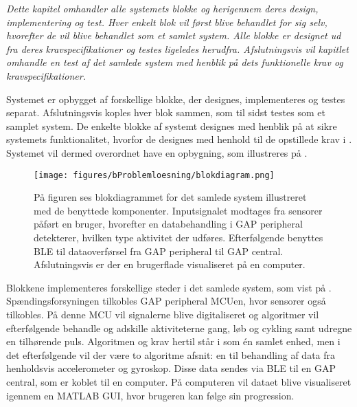 \textit{Dette kapitel omhandler alle systemets blokke og herigennem deres design, implementering og test. Hver enkelt blok vil først blive behandlet for sig selv, hvorefter de vil blive behandlet som et samlet system. Alle blokke er designet ud fra deres kravspecifikationer og testes ligeledes herudfra. Afslutningsvis vil kapitlet omhandle en test af det samlede system med henblik på dets funktionelle krav og kravspecifikationer.}

Systemet er opbygget af forskellige blokke, der designes, implementeres og testes separat. Afslutningsvis koples hver blok sammen, som til sidst testes som et samplet system. De enkelte blokke af systemt designes med henblik på at sikre systemets funktionalitet, hvorfor de designes med henhold til de opstillede krav i . Systemet vil dermed overordnet have en opbygning, som illustreres på .
\begin{figure}[H]
	\centering
	\texttt{[image: figures/bProblemloesning/blokdiagram.png]}
	\caption{På figuren ses blokdiagrammet for det samlede system illustreret med de benyttede komponenter. Inputsignalet modtages fra sensorer påført en bruger, hvorefter en databehandling i GAP peripheral detekterer, hvilken type aktivitet der udføres. Efterfølgende benyttes BLE til dataoverførsel fra GAP peripheral til GAP central. Afslutningsvis er der en brugerflade visualiseret på en computer.}
	\label{fig:design_blokdiagram}
\end{figure}
Blokkene implementeres forskellige steder i det samlede system, som vist på . Spændingsforsyningen tilkobles GAP peripheral MCUen, hvor sensorer også tilkobles. På denne MCU vil signalerne blive digitaliseret og algoritmer vil efterfølgende behandle og adskille aktiviteterne gang, løb og cykling samt udregne en tilhørende puls. Algoritmen og krav hertil står i  som én samlet enhed, men i det efterfølgende vil der være to algoritme afsnit: en til behandling af data fra henholdsvis accelerometer og gyroskop. Disse data sendes via BLE til en GAP central, som er koblet til en computer. På computeren vil dataet blive visualiseret igennem en MATLAB GUI, hvor brugeren kan følge sin progression.